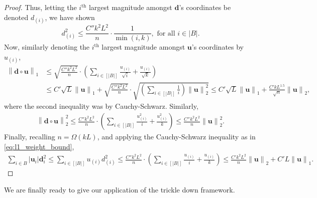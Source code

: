 \documentclass[11pt]{article}
\newcommand{\norm}[1]{\left\lVert#1\right\rVert}
\newcommand{\1}{\mathbf{1}}
\newcommand{\0}{\mathbf{0}}
\newcommand{\Par}[1]{\left(#1\right)}
\newcommand{\vd}{{\mathbf{d}}}
\newcommand{\vu}{{\mathbf{u}}}
\begin{document}
\begin{proof}
Thus, letting the $i^{\text{th}}$ largest magnitude amongst $\vd$'s coordinates be denoted $d_{(i)}$, we have shown
\begin{equation}\label{eq:d_bounds}d_{(i)}^2 \le \frac{C'' k^2 L^2}{n} \cdot \frac 1 {\min(i, k)},\text{ for all } i \in |B|.\end{equation}
Now, similarly denoting the $i^{\text{th}}$ largest magnitude amongst $\vu$'s coordinates by $u_{(i)}$,
\begin{equation}\label{eq:l1_weight_bound}
\begin{aligned}\norm{\vd \circ \vu}_1 &\le \sqrt{\frac{C'' k^2 L^2}{n}} \cdot \Par{\sum_{i \in [|B|]} \frac{u_{(i)}}{\sqrt{i}} + \frac{u_{(i)}}{\sqrt{k}}} \\
&\le C'\sqrt{L}\norm{\vu}_1 + \sqrt{\frac{C'' k^2 L^2}{n}} \cdot \sqrt{\Par{\sum_{i \in [|B|]}\frac 1 i}\norm{\vu}_2^2} \le C'\sqrt{L}\norm{\vu}_1 + \frac{C' kL^{1.5}}{\sqrt n}\norm{\vu}_2, \end{aligned}
\end{equation}
where the second inequality was by Cauchy-Schwarz. Similarly,
\begin{align*}
\norm{\vd \circ \vu}_2^2 \le \frac{C'' k^2 L^2}{n} \cdot \Par{\sum_{i \in [|B|]} \frac{u_{(i)}^2}{i} + \frac{u_{(i)}^2}{k}} \le \frac{C'' k^2 L^2}{n}\norm{\vu}_2^2.
\end{align*}
Finally, recalling $n = \Omega(kL)$, and applying the Cauchy-Schwarz inequality as in \eqref{eq:l1_weight_bound},
\begin{align*}
\sum_{i \in B} |\vu_i| \vd_i^2 \le \sum_{i \in [|B|]} u_{(i)}d_{(i)}^2 \le \frac{C'' k^2 L^2}{n} \cdot \Par{\sum_{i \in [|B|]} \frac{u_{(i)}}{i} + \frac{u_{(i)}}{k}} \le  \frac{C' k^2 L^2}{n}\norm{\vu}_2 + C' L \norm{\vu}_1 .
\end{align*}
\end{proof}

We are finally ready to give our application of the trickle down framework.
\end{document}
